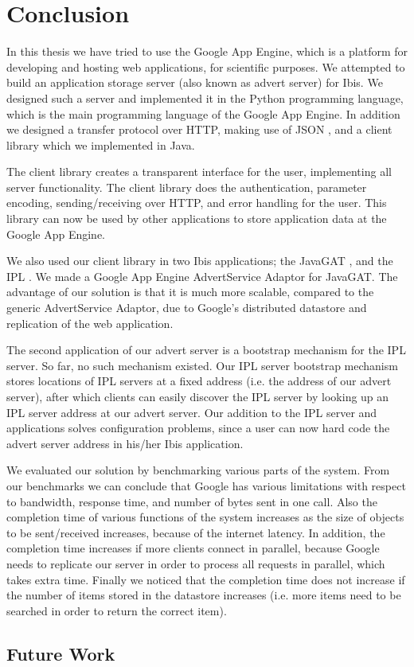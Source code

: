\section{Conclusion}
\label{conclusion}
In this thesis we have tried to use the Google App Engine, which is a platform
for developing and hosting web applications, for scientific purposes. We
attempted to build an application storage server (also known as advert server)
for Ibis. We designed such a server and implemented it in the Python programming
language, which is the main programming language of the Google App Engine. In
addition we designed a transfer protocol over HTTP, making use of JSON
\cite{json-www}, and a client library which we implemented in Java.

The client library creates a transparent interface for the user, implementing
all server functionality. The client library does the authentication, parameter
encoding, sending/receiving over HTTP, and error handling for the user. This
library can now be used by other applications to store application data at the
Google App Engine.

We also used our client library in two Ibis applications; the JavaGAT
\cite{javagat-www}, and the IPL \cite{ipl-www}. We made a Google App Engine
AdvertService Adaptor for JavaGAT. The advantage of our solution is that it is
much more scalable, compared to the generic AdvertService Adaptor, due to
Google's distributed datastore and replication of the web application.

The second application of our advert server is a bootstrap mechanism for the
IPL server. So far, no such mechanism existed. Our IPL server bootstrap
mechanism stores locations of IPL servers at a fixed address (i.e. the address
of our advert server), after which clients can easily discover the IPL server
by looking up an IPL server address at our advert server. Our addition to the
IPL server and applications solves configuration problems, since a user can now
hard code the advert server address in his/her Ibis application.

We evaluated our solution by benchmarking various parts of the system. From our
benchmarks we can conclude that Google has various limitations with respect to
bandwidth, response time, and number of bytes sent in one call. Also the
completion time of various functions of the system increases as the size of
objects to be sent/received increases, because of the internet latency. In
addition, the completion time increases if more clients connect in parallel,
because Google needs to replicate our server in order to process all requests in
parallel, which takes extra time. Finally we noticed that the completion time
does not increase if the number of items stored in the datastore increases
(i.e. more items need to be searched in order to return the correct item).

\subsection{Future Work}
\label{conclusion-future}